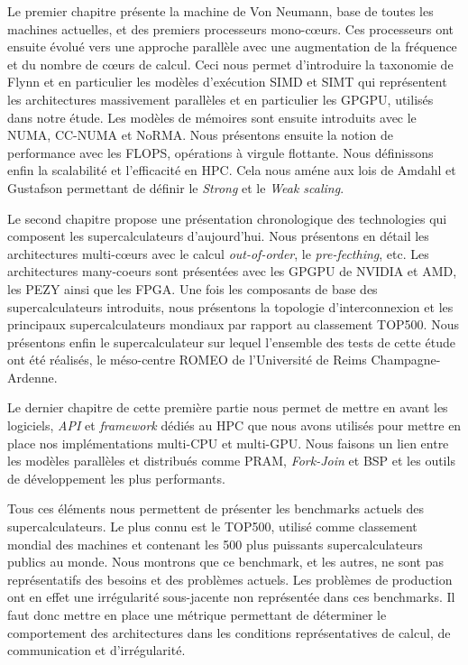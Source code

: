 \documentclass[12pt,a4paper]{report}
\begin{document}
Le premier chapitre présente la machine de Von Neumann, base de toutes les machines actuelles, et des premiers processeurs mono-cœurs. 
Ces processeurs ont ensuite évolué vers une approche parallèle avec une augmentation de la fréquence et du nombre de cœurs de calcul. 
Ceci nous permet d'introduire la taxonomie de Flynn et en particulier les modèles d'exécution SIMD et SIMT qui représentent les architectures massivement parallèles et en particulier les GPGPU, utilisés dans notre étude. 
Les modèles de mémoires sont ensuite introduits avec le NUMA, CC-NUMA et NoRMA.
Nous présentons ensuite la notion de performance avec les FLOPS, opérations à virgule flottante. 
Nous définissons enfin la scalabilité et l'efficacité en HPC.
Cela nous améne aux lois de Amdahl et Gustafson permettant de définir le \textit{Strong} et le \textit{Weak scaling}.

Le second chapitre propose une présentation chronologique des technologies qui composent les supercalculateurs d'aujourd'hui.
Nous présentons en détail les architectures multi-cœurs avec le calcul \textit{out-of-order}, le \textit{pre-fecthing}, etc.
Les architectures many-coeurs sont présentées avec les GPGPU de NVIDIA et AMD, les PEZY ainsi que les FPGA.
Une fois les composants de base des supercalculateurs introduits, nous présentons la topologie d'interconnexion et les principaux supercalculateurs mondiaux par rapport au classement TOP500.
Nous présentons enfin le supercalculateur sur lequel l'ensemble des tests de cette étude ont été réalisés, le méso-centre ROMEO de l'Université de Reims Champagne-Ardenne.

Le dernier chapitre de cette première partie nous permet de mettre en avant les logiciels, \textit{API} et \textit{framework} dédiés au HPC que nous avons utilisés pour mettre en place nos implémentations multi-CPU et multi-GPU. 
Nous faisons un lien entre les modèles parallèles et distribués comme PRAM, \textit{Fork-Join} et BSP et les outils de développement les plus performants. 

Tous ces éléments nous permettent de présenter les benchmarks actuels des supercalculateurs. 
Le plus connu est le TOP500, utilisé comme classement mondial des machines et contenant les 500 plus puissants supercalculateurs publics au monde. 
Nous montrons que ce benchmark, et les autres, ne sont pas représentatifs des besoins et des problèmes actuels. 
Les problèmes de production ont en effet une irrégularité sous-jacente non représentée dans ces benchmarks. 
Il faut donc mettre en place une métrique permettant de déterminer le comportement des architectures dans les conditions représentatives de calcul, de communication et d'irrégularité. 
\end{document}
